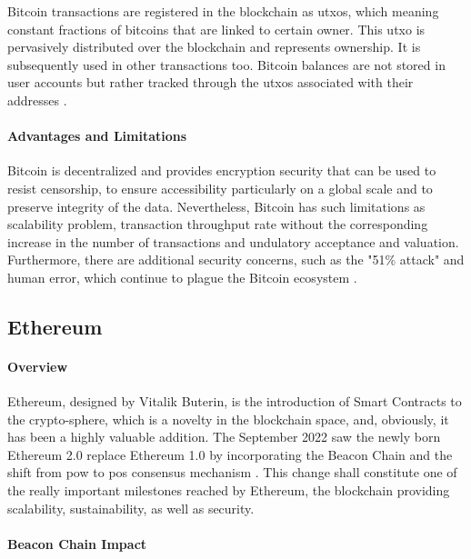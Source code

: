 Bitcoin transactions are registered in the blockchain as \gls{utxo}s, which meaning constant fractions of bitcoins that are linked to certain owner. 
This \gls{utxo} is pervasively distributed over the blockchain and represents ownership. It is subsequently used in other transactions too. Bitcoin balances are not stored in user 
accounts but rather tracked through the \gls{utxo}s associated with their addresses \cite{bitcoincom}.

\paragraph{Advantages and Limitations}

Bitcoin is decentralized and provides encryption security that can be used to resist censorship, to ensure accessibility particularly on a global scale and to preserve integrity 
of the data. Nevertheless, Bitcoin has such limitations as scalability problem, transaction throughput rate without the corresponding increase in the number of transactions 
and undulatory acceptance and valuation. Furthermore, there are additional security concerns, such as the "51\% attack" and human error, which continue to plague the Bitcoin 
ecosystem \cite{9129332}.

\subsection{Ethereum} \label{subsec:ethereum}

\paragraph{Overview}

Ethereum, designed by Vitalik Buterin, is the introduction of Smart Contracts to the crypto-sphere, which is a novelty in the blockchain space, and, obviously, it has been 
a highly valuable addition. The September 2022 saw the newly born Ethereum 2.0 replace Ethereum 1.0 by incorporating the Beacon Chain and the shift from \gls{pow} 
to \gls{pos} consensus mechanism \cite{ethereummerge}. This change shall constitute one of the really important milestones reached by Ethereum, the blockchain providing 
scalability, sustainability, as well as security.

\paragraph{Beacon Chain Impact}


